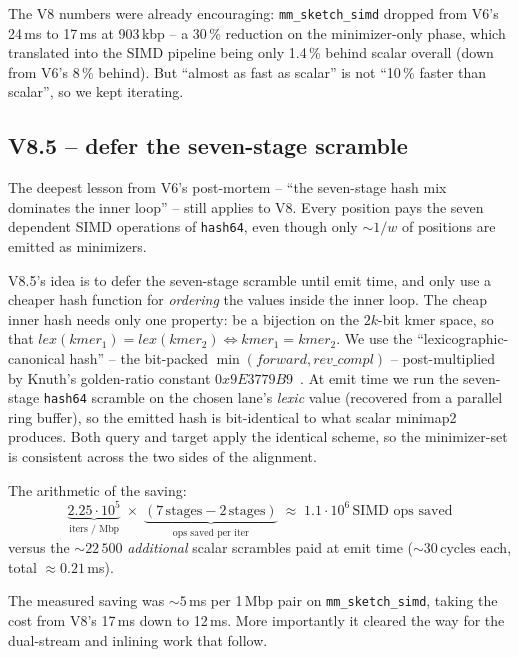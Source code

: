 The V8 numbers were already encouraging:
\texttt{mm\_sketch\_simd} dropped from V6's 24\,ms to 17\,ms at
903\,kbp -- a 30\,\% reduction on the minimizer-only phase, which
translated into the SIMD pipeline being only 1.4\,\% behind scalar
overall (down from V6's 8\,\% behind).  But ``almost as fast as
scalar'' is not ``10\,\% faster than scalar'', so we kept iterating.

\subsection{V8.5 -- defer the seven-stage scramble}
\label{sec:v8-defer-scramble}

The deepest lesson from V6's post-mortem -- ``the seven-stage hash
mix dominates the inner loop'' -- still applies to V8.  Every
position pays the seven dependent SIMD operations of
\texttt{hash64}, even though only $\sim 1/w$ of positions are
emitted as minimizers.

V8.5's idea is to defer the seven-stage scramble until emit time, and
only use a cheaper hash function for \emph{ordering} the values
inside the inner loop.  The cheap inner hash needs only one
property: be a bijection on the $2k$-bit kmer space, so that
$\textit{lex}(\textit{kmer}_1) = \textit{lex}(\textit{kmer}_2) \iff
\textit{kmer}_1 = \textit{kmer}_2$.  We use the
``lexicographic-canonical hash'' -- the bit-packed
$\min(\textit{forward}, \textit{rev\_compl})$ -- post-multiplied
by Knuth's golden-ratio constant
$0x9E3779B9$~\cite{knuth_taocp_v3}.  At emit time we run the
seven-stage \texttt{hash64} scramble on the chosen lane's
\emph{lexic} value (recovered from a parallel ring buffer), so the
emitted hash is bit-identical to what scalar minimap2 produces.
Both query and target apply the identical scheme, so the
minimizer-set is consistent across the two sides of the alignment.

The arithmetic of the saving:
\[
\underbrace{2.25 \cdot 10^5}_{\text{iters / Mbp}}
\;\times\;
\underbrace{(7\,\text{stages} - 2\,\text{stages})}_{\text{ops saved per iter}}
\;\approx\;
1.1 \cdot 10^6\,\text{SIMD ops saved}
\]
versus the
$\sim 22\,500$ \emph{additional} scalar scrambles paid at emit time
($\sim 30\,\text{cycles}$ each, total $\approx 0.21$\,ms).

The measured saving was $\sim 5$\,ms per 1\,Mbp pair on
\texttt{mm\_sketch\_simd}, taking the cost from V8's 17\,ms down to
12\,ms.  More importantly it cleared the way for the dual-stream and
inlining work that follow.

